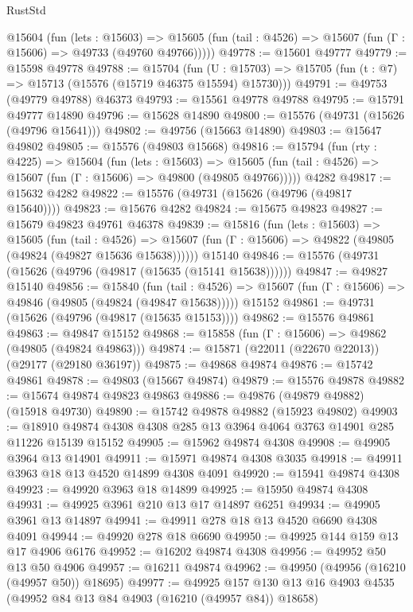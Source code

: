 \begin{lexlean}{RustStd}
\begin{coremodule}
    @15604
      (fun (lets : @15603) =>
      @15605 (fun (tail : @4526) => @15607 (fun (Γ : @15606) => @49733 (@49760 @49766)))))
@49778 := @15601 @49777
@49779 := @15598 @49778
@49788 := @15704
    (fun (U : @15703) => @15705 (fun (t : @7) => @15713 (@15576 (@15719 @46375 @15594) @15730)))
@49791 := @49753 (@49779 @49788) @46373
@49793 := @15561 @49778 @49788
@49795 := @15791 @49777 @14890
@49796 := @15628 @14890
@49800 := @15576 (@49731 (@15626 (@49796 @15641)))
@49802 := @49756 (@15663 @14890)
@49803 := @15647 @49802
@49805 := @15576 (@49803 @15668)
@49816 := @15794
    (fun (rty : @4225) =>
    @15604
      (fun (lets : @15603) =>
      @15605 (fun (tail : @4526) => @15607 (fun (Γ : @15606) => @49800 (@49805 @49766)))))
    @4282
@49817 := @15632 @4282
@49822 := @15576 (@49731 (@15626 (@49796 (@49817 @15640))))
@49823 := @15676 @4282
@49824 := @15675 @49823
@49827 := @15679 @49823 @49761 @46378
@49839 := @15816
    (fun (lets : @15603) =>
    @15605
      (fun (tail : @4526) =>
      @15607 (fun (Γ : @15606) => @49822 (@49805 (@49824 (@49827 @15636 @15638))))))
    @15140
@49846 := @15576 (@49731 (@15626 (@49796 (@49817 (@15635 (@15141 @15638))))))
@49847 := @49827 @15140
@49856 := @15840
    (fun (tail : @4526) => @15607 (fun (Γ : @15606) => @49846 (@49805 (@49824 (@49847 @15638)))))
    @15152
@49861 := @49731 (@15626 (@49796 (@49817 (@15635 @15153))))
@49862 := @15576 @49861
@49863 := @49847 @15152
@49868 := @15858 (fun (Γ : @15606) => @49862 (@49805 (@49824 @49863)))
@49874 := @15871 (@22011 (@22670 @22013)) (@29177 (@29180 @36197))
@49875 := @49868 @49874
@49876 := @15742 @49861
@49878 := @49803 (@15667 @49874)
@49879 := @15576 @49878
@49882 := @15674 @49874 @49823 @49863
@49886 := @49876 (@49879 @49882) (@15918 @49730)
@49890 := @15742 @49878 @49882 (@15923 @49802)
@49903 := @18910 @49874 @4308 @4308 @285 @13 @3964 @4064 @3763 @14901 @285 @11226 @15139 @15152
@49905 := @15962 @49874 @4308
@49908 := @49905 @3964 @13 @14901
@49911 := @15971 @49874 @4308 @3035
@49918 := @49911 @3963 @18 @13 @4520 @14899 @4308 @4091
@49920 := @15941 @49874 @4308
@49923 := @49920 @3963 @18 @14899
@49925 := @15950 @49874 @4308
@49931 := @49925 @3961 @210 @13 @17 @14897 @6251
@49934 := @49905 @3961 @13 @14897
@49941 := @49911 @278 @18 @13 @4520 @6690 @4308 @4091
@49944 := @49920 @278 @18 @6690
@49950 := @49925 @144 @159 @13 @17 @4906 @6176
@49952 := @16202 @49874 @4308
@49956 := @49952 @50 @13 @50 @4906
@49957 := @16211 @49874
@49962 := @49950 (@49956 (@16210 (@49957 @50)) @18695)
@49977 := @49925
    @157
    @130
    @13
    @16
    @4903
    @4535
    (@49952 @84 @13 @84 @4903 (@16210 (@49957 @84)) @18658)

\end{coremodule}
\end{lexlean}

